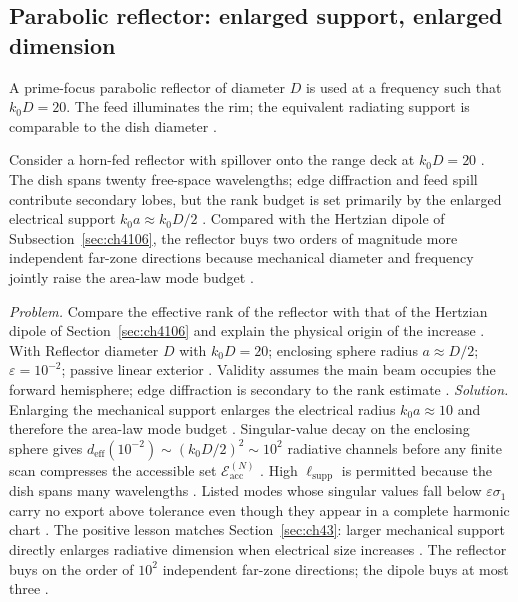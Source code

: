 \subsection{Parabolic reflector: enlarged support, enlarged dimension}
\label{sec:ch4107}
A prime-focus parabolic reflector of diameter $D$ is used at a frequency such that $k_{0}D=20$. The feed illuminates the rim; the equivalent radiating support is comparable to the dish diameter \cite{harrington2001}.
\begin{physicalvignette}
Consider a horn-fed reflector with spillover onto the range deck at $k_{0}D=20$ \cite{harrington2001}. The dish spans twenty free-space wavelengths; edge diffraction and feed spill contribute secondary lobes, but the rank budget is set primarily by the enlarged electrical support $k_{0}a\approx k_{0}D/2$ \cite{stratton1941}. Compared with the Hertzian dipole of Subsection~\ref{sec:ch4106}, the reflector buys two orders of magnitude more independent far-zone directions because mechanical diameter and frequency jointly raise the area-law mode budget \cite{chu1948}.
\end{physicalvignette}
\emph{Problem.} Compare the effective rank of the reflector with that of the Hertzian dipole of Section~\ref{sec:ch4106} and explain the physical origin of the increase .
With Reflector diameter $D$ with $k_{0}D=20$; enclosing sphere radius $a\approx D/2$; $\varepsilon=10^{-2}$; passive linear exterior . Validity assumes the main beam occupies the forward hemisphere; edge diffraction is secondary to the rank estimate .
\emph{Solution.} Enlarging the mechanical support enlarges the electrical radius $k_{0}a\approx10$ and therefore the area-law mode budget . Singular-value decay on the enclosing sphere gives $d_{\mathrm{eff}}(10^{-2})\sim(k_{0}D/2)^{2}\sim 10^{2}$ radiative channels before any finite scan compresses the accessible set $\mathcal{E}_{\mathrm{acc}}^{(N)}$ . High $\ell_{\mathrm{supp}}$ is permitted because the dish spans many wavelengths .
Listed modes whose singular values fall below $\varepsilon\sigma_{1}$ carry no export above tolerance even though they appear in a complete harmonic chart . The positive lesson matches Section~\ref{sec:ch43}: larger mechanical support directly enlarges radiative dimension when electrical size increases . The reflector buys on the order of $10^{2}$ independent far-zone directions; the dipole buys at most three .
